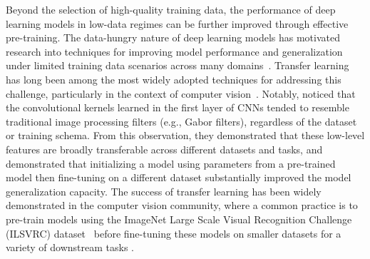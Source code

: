 Beyond the selection of high-quality training data, the performance of deep learning models in low-data regimes can be further improved through effective pre-training.
The data-hungry nature of deep learning models has motivated research into techniques for improving model performance and generalization under limited training data scenarios across many domains~\citep{adadiSurveyDataefficientAlgorithms2021}.
Transfer learning has long been among the most widely adopted techniques for addressing this challenge, particularly in the context of computer vision~\citep{zhouTrainingDataSelection2020}.
Notably, \citet{yosinskiHowTransferableAre2014} noticed that the convolutional kernels learned in the first layer of CNNs tended to resemble traditional image processing filters (e.g., Gabor filters), regardless of the dataset or training schema.
From this observation, they demonstrated that these low-level features are broadly transferable across different datasets and tasks, and demonstrated that initializing a model using parameters from a pre-trained model then fine-tuning on a different dataset substantially improved the model generalization capacity.
The success of transfer learning has been widely demonstrated in the computer vision community, where a common practice is to pre-train models using the ImageNet Large Scale Visual Recognition Challenge (ILSVRC) dataset~\citep{yosinskiHowTransferableAre2014} before fine-tuning these models on smaller datasets for a variety of downstream tasks \citep{huhWhatMakesImageNet2016}.

